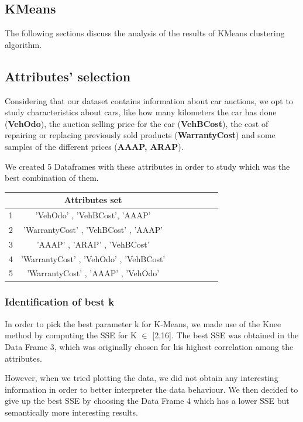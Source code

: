 \documentclass{article}
\begin{document}
	\subsection{KMeans}
	The following sections discuss the analysis of the results of KMeans clustering algorithm.
	
	\subsection{Attributes' selection}
	Considering that our dataset contains information about car auctions, we opt to study characteristics about cars, like how many kilometers the car has done (\textbf{VehOdo}), the auction selling price for the car (\textbf{VehBCost}), the cost of repairing or replacing previously sold products (\textbf{WarrantyCost}) and some samples of the different prices (\textbf{AAAP, ARAP}).
	
	We created 5 Dataframes with these attributes in order to study which was the best combination of them.
	
	\begin{table}[H]
		\centering
		\begin{tabular}{c|ccccccc}
			\hline
			& Attributes set \\
			\hline
			\rowcolor{Gray}
			1 & 'VehOdo' ,  'VehBCost',  'AAAP' \\
			2 & 'WarrantyCost' , 'VehBCost' ,  'AAAP'  \\
			\rowcolor{Gray}
			3 & 'AAAP' ,  'ARAP' ,  'VehBCost' \\
			4 & 'WarrantyCost' ,  'VehOdo' ,  'VehBCost'  \\
			\rowcolor{Gray}
			5 & 'WarrantyCost' ,  'AAAP' , 'VehOdo' \\
			\hline
		\end{tabular}
	\end{table}
	
	
	\subsubsection{Identification of best k}
	
	
	In order to pick the best parameter k for K-Means, we made use of the Knee method by computing the SSE for K $\in$ [2,16]. The best SSE was obtained in the Data Frame 3, which was originally chosen for his highest correlation among the attributes.
	
	However, when we tried plotting the data, we did not obtain any interesting information in order to better interpreter the data behaviour. We then decided to give up the best SSE by choosing the Data Frame 4 which has a lower SSE but semantically more interesting results.
	
\end{document}
